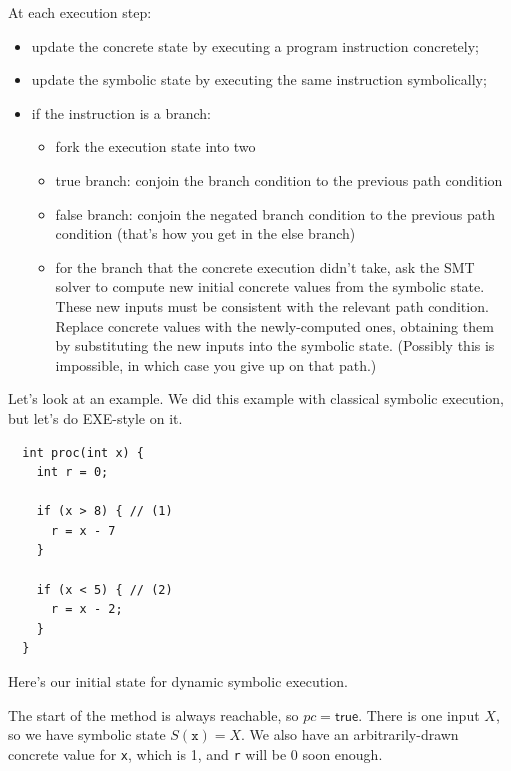 \documentclass[11pt]{article}
\begin{document}
At each execution step:
\begin{itemize}[noitemsep]
\item update the concrete state by executing a program instruction concretely;
\item update the symbolic state by executing the same instruction symbolically;
\item if the instruction is a branch:
  \begin{itemize}
    \item fork the execution state into two
    \item true branch: conjoin the branch condition to the previous path condition
    \item false branch: conjoin the negated branch condition to the previous path condition (that's how you get in the else branch)
    \item for the branch that the concrete execution didn't take, ask the SMT solver to compute new initial concrete values from the symbolic state. These new inputs must be consistent with the relevant path condition. Replace concrete values with the newly-computed ones, obtaining them by substituting the new inputs into the symbolic state. (Possibly this is impossible, in which case you give up on that path.)
  \end{itemize}
\end{itemize}
Let's look at an example. We did this example with classical symbolic execution, but let's do EXE-style on it.
\begin{lstlisting}
  int proc(int x) {
    int r = 0;

    if (x > 8) { // (1)
      r = x - 7
    }

    if (x < 5) { // (2)
      r = x - 2;
    }
  }
\end{lstlisting}

Here's our initial state for dynamic symbolic execution.

\begin{center}
\end{center}
The start of the method is always reachable, so \textbf{$pc = \textsf{true}$}. There is one input $X$,
so we have symbolic state $S(\mathtt{x}) = X$. We also have an arbitrarily-drawn concrete value for
\texttt{x}, which is 1, and \texttt{r} will be 0 soon enough.
\end{document}
